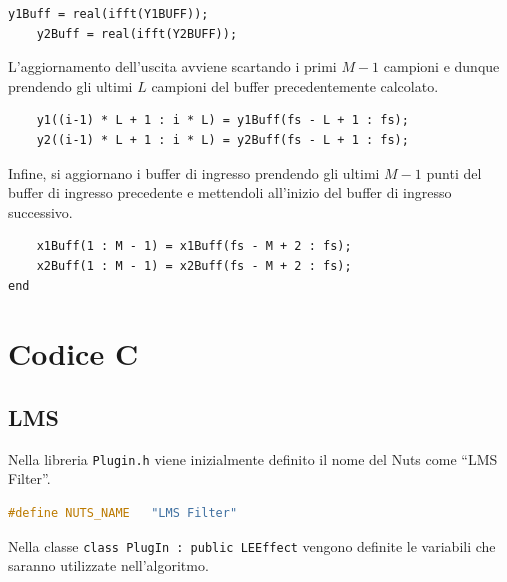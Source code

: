 \documentclass[12pt,a4paper,titlepage]{article}
\begin{document}
\begin{lstlisting}[label=code:ols4, caption=IFFT del buffer di uscita, captionpos=b]
	y1Buff = real(ifft(Y1BUFF));
	y2Buff = real(ifft(Y2BUFF));
\end{lstlisting}  

L'aggiornamento dell'uscita avviene scartando i primi $M - 1$ campioni e dunque prendendo gli ultimi $L$ campioni del buffer precedentemente calcolato.

\begin{lstlisting}[label=code:ols5, caption=Aggiornamento dell'uscita, captionpos=b]
	% discard first M - 1 values
	y1((i-1) * L + 1 : i * L) = y1Buff(fs - L + 1 : fs); 
	y2((i-1) * L + 1 : i * L) = y2Buff(fs - L + 1 : fs); 
\end{lstlisting}  

Infine, si aggiornano i buffer di ingresso prendendo gli ultimi $M - 1$ punti del buffer di ingresso precedente e mettendoli all'inizio del buffer di ingresso successivo.

\begin{lstlisting}[label=code:ols6, caption=Aggiornamento del buffer di ingresso, captionpos=b, language=matlabfloz]
    % first M - 1 values of the new vector must be the last ones of the previous array
    x1Buff(1 : M - 1) = x1Buff(fs - M + 2 : fs); 
    x2Buff(1 : M - 1) = x2Buff(fs - M + 2 : fs); 
end
\end{lstlisting}  

\clearpage

\section{Codice C}
\label{sec:codice_c}
\subsection{LMS}
\label{sec:codice_c_lms}
Nella libreria \texttt{Plugin.h} viene inizialmente definito il nome del Nuts come ``LMS Filter''.

\begin{lstlisting}[language=cpp]
#define NUTS_NAME	"LMS Filter"
\end{lstlisting}
Nella classe \texttt{class PlugIn :	public LEEffect} vengono definite le variabili che saranno utilizzate nell'algoritmo.
\end{document}
